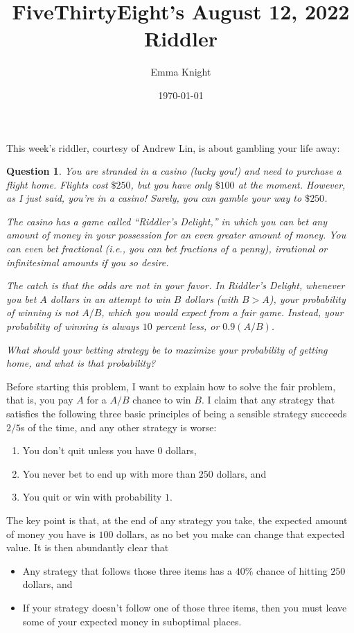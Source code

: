 \documentclass[11pt]{article}
\title{FiveThirtyEight's August 12, 2022 Riddler}
\author{Emma Knight}
\date{\today}
\newtheorem{question}[theorem]{Question}
\theoremstyle{definition}
\begin{document}
\maketitle
This week's riddler, courtesy of Andrew Lin, is about gambling your life away:
\begin{question}
You are stranded in a casino (lucky you!) and need to purchase a flight home. Flights cost $\$250$, but you have only $\$100$ at the moment. However, as I just said, you’re in a casino! Surely, you can gamble your way to $\$250$.

The casino has a game called ``Riddler’s Delight,'' in which you can bet any amount of money in your possession for an even greater amount of money. You can even bet fractional (i.e., you can bet fractions of a penny), irrational or infinitesimal amounts if you so desire.

The catch is that the odds are not in your favor. In Riddler’s Delight, whenever you bet $A$ dollars in an attempt to win $B$ dollars (with $B > A$), your probability of winning is not $A/B$, which you would expect from a fair game. Instead, your probability of winning is always $10$ percent less, or $0.9(A/B)$.

What should your betting strategy be to maximize your probability of getting home, and what is that probability?
\end{question}
Before starting this problem, I want to explain how to solve the fair problem, that is, you pay $A$ for a $A/B$ chance to win $B$.  I claim that any strategy that satisfies the following three basic principles of being a sensible strategy succeeds $2/5$s of the time, and any other strategy is worse:
\begin{enumerate}
\item You don't quit unless you have $0$ dollars,
\item You never bet to end up with more than $250$ dollars, and
\item You quit or win with probability $1$.
\end{enumerate}

The key point is that, at the end of any strategy you take, the expected amount of money you have is $100$ dollars, as no bet you make can change that expected value.  It is then abundantly clear that
\begin{itemize}
\item Any strategy that follows those three items has a $40\%$ chance of hitting $250$ dollars, and
\item If your strategy doesn't follow one of those three items, then you must leave some of your expected money in suboptimal places.
\end{itemize}
\end{document}

